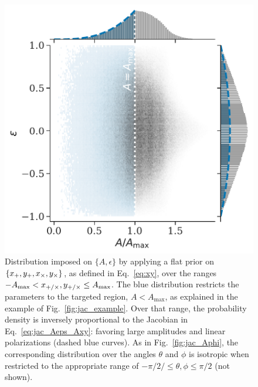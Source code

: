\documentclass[aps,prd,twocolumn,superscriptaddress,preprintnumbers,floatfix,nofootinbib]{revtex4-2}
\newcommand*{\eq}[1]{Eq.~\eqref{eq:#1}}
\begin{document}
\begin{figure}
\includegraphics[width=\columnwidth]{jac_Aeps_Axy}
\caption{Distribution imposed on $\{A,\epsilon\}$ by applying a flat prior on $\{x_{+}, y_{+}, x_{\times}, y_{\times}\}$, as defined in \eq{xy}, over the ranges $- A_{\max} < x_{+/\times},y_{+/\times} \leq A_{\max}$.
The blue distribution restricts the parameters to the targeted region, $A < A_{\max}$, as explained in the example of Fig.~\ref{fig:jac_example}.
Over that range, the probability density is inversely proportional to the Jacobian in \eq{jac_Aeps_Axy}: favoring large amplitudes and linear polarizations (dashed blue curves).
As in Fig.~\ref{fig:jac_Aphi}, the corresponding distribution over the angles $\theta$ and $\phi$ is isotropic when restricted to the appropriate range of $-\pi/2/ \leq \theta,\phi \leq \pi/2$ (not shown).
}
\label{fig:jac_Axy}
\end{figure}
\end{document}
